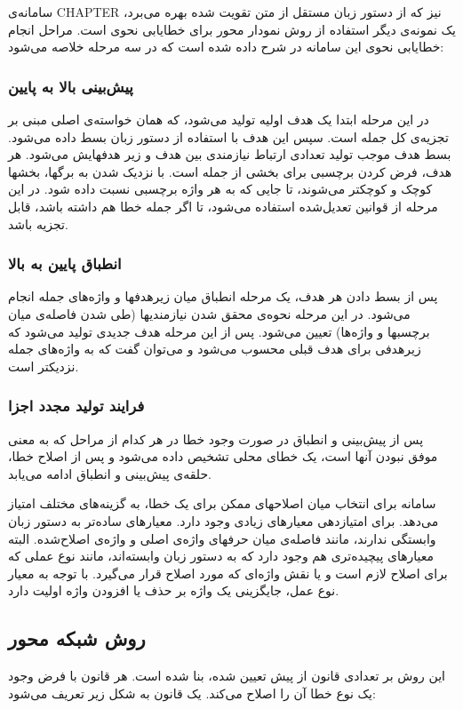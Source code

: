 \documentclass{report}
\begin{document}
سامانه‌ی CHAPTER \cite{ct11} نیز که از دستور زبان مستقل از متن تقویت شده بهره می‌برد، یک نمونه‌ی دیگر استفاده‌ از روش نمودار محور برای خطایابی نحوی است. مراحل انجام خطایابی نحوی این سامانه در \cite{ct12} شرح داده شده است که در سه مرحله خلاصه می‌شود:

\subsubsection{پیش‌بینی بالا به پایین}
در این مرحله ابتدا یک هدف اولیه تولید می‌شود، که همان خواسته‌ی اصلی مبنی بر تجزیه‌ی کل جمله است. سپس این هدف با استفاده از دستور زبان بسط داده می‌شود. بسط هدف موجب تولید تعدادی ارتباط نیازمندی بین هدف و زیر هدفهایش می‌شود. هر هدف، فرض کردن برچسبی برای بخشی از جمله است. با نزدیک شدن به برگها، بخشها کوچک و کوچکتر می‌شوند، تا جایی که به هر واژه برچسبی نسبت داده شود. در این مرحله از قوانین تعدیل‌شده استفاده می‌شود، تا اگر جمله خطا هم داشته باشد، قابل تجزیه باشد.

\subsubsection{انطباق پایین به بالا}
پس از بسط دادن هر هدف، یک مرحله انطباق میان زیر‌هدفها و واژه‌های جمله انجام می‌شود. در این مرحله نحوه‌ی محقق شدن نیازمندیها (طی شدن فاصله‌ی میان برچسبها و واژه‌ها) تعیین می‌شود. پس از این مرحله هدف جدیدی تولید می‌شود که زیرهدفی برای هدف قبلی محسوب می‌شود و می‌توان گفت که به واژه‌های جمله نزدیکتر است.

\subsubsection{فرایند تولید مجدد اجزا}
پس از پیش‌بینی و انطباق در صورت وجود خطا در هر کدام از مراحل که به معنی موفق نبودن آنها است، یک خطای محلی تشخیص داده می‌شود و پس از اصلاح خطا، حلقه‌ی پیش‌بینی و انطباق ادامه می‌یابد.

سامانه برای انتخاب میان اصلاحهای ممکن برای یک خطا، به گزینه‌های مختلف امتیاز می‌دهد. برای امتیازدهی معیارهای زیادی وجود دارد. معیارهای ساده‌تر به دستور زبان وابستگی ندارند، مانند فاصله‌ی میان حرفهای واژه‌ی اصلی و واژه‌ی اصلاح‌شده. البته معیارهای پیچیده‌تری هم وجود دارد که به دستور زبان وابسته‌اند، مانند نوع عملی که برای اصلاح لازم است و یا نقش واژه‌ای که مورد اصلاح قرار می‌گیرد. با توجه به معیار نوع عمل، جایگزینی یک واژه بر حذف یا افزودن واژه اولیت دارد.

\subsection{روش شبکه محور}
این روش بر تعدادی قانون از پیش تعیین شده، بنا شده است. هر قانون با فرض وجود یک نوع خطا آن را اصلاح می‌کند. یک قانون به شکل زیر تعریف می‌شود:
\end{document}
